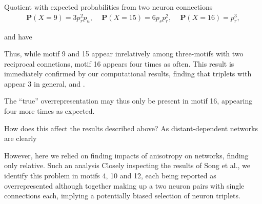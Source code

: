 Quotient with expected probabilities from two neuron connections 
\begin{align*}
      \mathbf{P}(X=9)    =   3 p_r^2 p_u, \quad\,       \mathbf{P}(X=15)   =
      6 p_s p_r^2, \quad\, \mathbf{P}(X=16)   =   p_r^3,
\end{align*}

and have 


Thus, while motif 9 and 15 appear inrelatively among three-motifs with
two reciprocal connetions, motif 16 appears four times as often. This
result is immediately confirmed by our computational results, finding
that triplets with appear 3 in general, and .


The \enquote{true} overrepresentation may thus only be present in
motif 16, appearing four more times as expected. 


 How does this affect the results described
above? As distant-dependent networks are clearly 

However, here we relied on finding impacts of anisotropy on networks,
finding only relative. Such an analysis Closely inspecting the results
of Song et al., we identify this problem in motifs 4, 10 and 12, each
being reported as overrepresented although together making up a two
neuron pairs with single connections each, implying a potentially
biased selection of neuron triplets.










